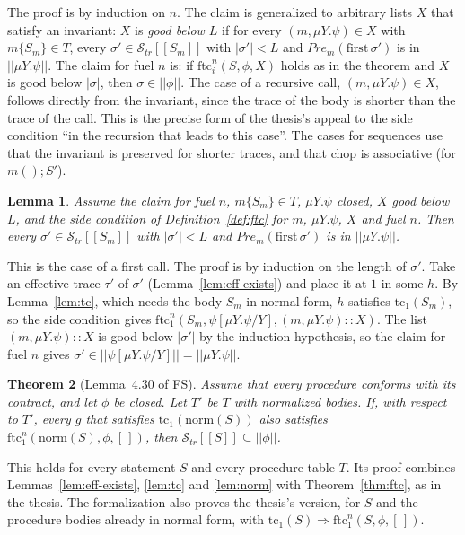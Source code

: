 \documentclass[11pt]{article}
\newcommand{\sem}[1]{[\![ #1 ]\!]}
\newcommand{\fsem}[1]{|\!|#1|\!|}
\newcommand{\Str}{{\mathcal{S}_{\mathit{tr}}}}
\newcommand{\call}[1]{#1()}
\newcommand{\Pre}{\mathit{Pre}}
\newcommand{\tc}{\mathrm{tc}}
\newcommand{\ftc}{\mathrm{ftc}}
\newcommand{\norm}{\mathrm{norm}}
\newcommand{\first}{\mathrm{first}}
\newcommand{\Th}[1]{#1 of FS}
\theoremstyle{plain}
\newtheorem{theorem}{Theorem}[section]
\newtheorem{lemma}[theorem]{Lemma}
\theoremstyle{definition}
\theoremstyle{remark}
\begin{document}
The proof is by induction on $n$. The claim is generalized to arbitrary
lists $X$ that satisfy an invariant: $X$ is \emph{good below $L$} if for
every $(m, \mu Y.\psi) \in X$ with $m\{S_m\} \in T$, every
$\sigma' \in \Str\sem{S_m}$ with $|\sigma'| < L$ and
$\Pre_m(\first\,\sigma')$ is in $\fsem{\mu Y.\psi}$. The claim for fuel
$n$ is: if $\ftc^n_i(S, \phi, X)$ holds as in the theorem and $X$ is good
below $|\sigma|$, then $\sigma \in \fsem{\phi}$. The case of a recursive
call, $(m, \mu Y.\psi) \in X$, follows directly from the invariant, since the
trace of the body is shorter than the trace of the call. This is the
precise form of the thesis's appeal to the side condition ``in the
recursion that leads to this case''. The cases for sequences use that
the invariant is preserved for shorter traces, and that chop is
associative (for $\call{m}; S'$).

\begin{lemma}\label{lem:side}
  Assume the claim for fuel $n$, $m\{S_m\} \in T$, $\mu Y.\psi$ closed,
  $X$ good below $L$, and the side condition of
  Definition~\ref{def:ftc} for $m$, $\mu Y.\psi$, $X$ and fuel $n$. Then
  every $\sigma' \in \Str\sem{S_m}$ with $|\sigma'| < L$ and
  $\Pre_m(\first\,\sigma')$ is in $\fsem{\mu Y.\psi}$.
\end{lemma}

This is the case of a first call. The proof is by induction on the length
of $\sigma'$. Take an effective trace $\tau'$ of $\sigma'$
(Lemma~\ref{lem:eff-exists}) and place it at $1$ in some $h$. By
Lemma~\ref{lem:tc}, which needs the body $S_m$ in normal form, $h$
satisfies $\tc_1(S_m)$, so the side condition gives
$\ftc^n_1(S_m, \psi[\mu Y.\psi/Y], (m, \mu Y.\psi) :: X)$. The list
$(m, \mu Y.\psi) :: X$ is good below $|\sigma'|$ by the induction
hypothesis, so the claim for fuel $n$ gives
$\sigma' \in \fsem{\psi[\mu Y.\psi/Y]} = \fsem{\mu Y.\psi}$.

\begin{theorem}[\Th{Lemma~4.30}]\label{thm:vc}
  Assume that every procedure conforms with its contract, and let $\phi$
  be closed. Let $T'$ be $T$ with normalized bodies. If, with respect to
  $T'$, every $g$ that satisfies $\tc_1(\norm(S))$ also satisfies
  $\ftc^n_1(\norm(S), \phi, [\,])$, then $\Str\sem{S} \subseteq
  \fsem{\phi}$.
\end{theorem}

This holds for every statement $S$ and every procedure table $T$. Its
proof combines Lemmas~\ref{lem:eff-exists}, \ref{lem:tc} and
\ref{lem:norm} with Theorem~\ref{thm:ftc}, as in the thesis. The
formalization also proves the thesis's version, for $S$ and the procedure
bodies already in normal form, with $\tc_1(S) \Rightarrow
\ftc^n_1(S, \phi, [\,])$.
\end{document}
